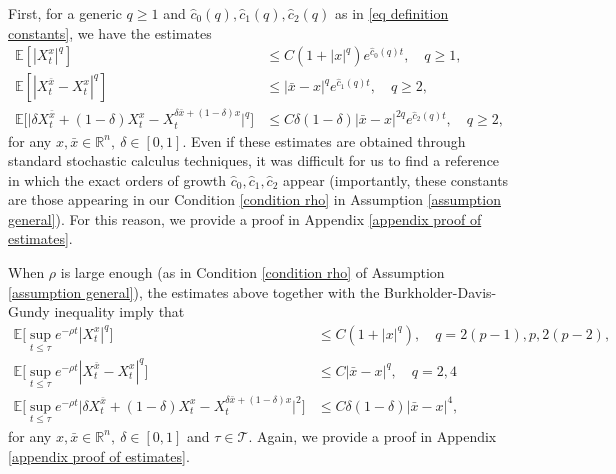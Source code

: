 \documentclass[11pt]{amsart}
\theoremstyle{plain}
\numberwithin{equation}{section}
\begin{document}
First, for a generic $q \geq 1$ and $ \hat c _0(q),  \hat c _1(q),  \hat c _2(q)$ as in \eqref{eq definition constants}, we have the estimates
\begin{align}
\label{eq estimate SDE growth} 
\mathbb{E}[ |  X ^x_t |^{q} ]  & \leq C (1+|x|^q) e^{  \hat c _0(q) t}, \quad q\geq 1,   \\ 
\label{eq estimate SDE Lip} \mathbb{E}[ |  X^{\bar x}_t - X ^x_t |^{q} ] & \leq |\bar{x} - x|^q e^{  \hat c _1(q) t} , \quad q\geq 2, \\ 
 \label{eq estimate SDE semiconv} 
 \mathbb{E} \big[  \big|  \delta X^{\bar x}_t + (1-\delta) X^x_t - X ^{\delta \bar x + (1-\delta) x}_t \big|^q \big] & \leq C \delta (1-\delta) |\bar{x} - x|^{2q} e^{  \hat c _2(q) t}, \quad q \geq 2,
\end{align}
for any $x,\bar x \in \mathbb R ^n, \ \delta \in [0,1]$.
Even if these estimates are obtained through standard stochastic calculus techniques, it was difficult for us to find a reference in which the exact orders of growth $\hat c_0, \hat c_1, \hat c_2$ appear (importantly, these constants are those appearing in our Condition \ref{condition rho} in Assumption \ref{assumption general}). 
For this reason, we provide a proof in Appendix \ref{appendix proof of estimates}.

When $\rho$ is large enough (as in Condition \ref{condition rho} of Assumption \ref{assumption general}), 
the estimates above together with the Burkholder-Davis-Gundy inequality imply that
\begin{align}
\label{eq estimate SDE growth SUP} 
\mathbb{E}\bigg[ \sup_{t \leq \tau}  e^{-\rho t} |  X ^x_t |^{q} \bigg]  & \leq C (1+|x|^q), \quad q = 2(p-1),p,2(p-2),  \\ 
\label{eq estimate SDE Lip SUP} 
\mathbb{E} \bigg[ \sup_{t \leq \tau}  e^{-\rho t} |  X^{\bar x}_t - X ^x_t |^{q} \bigg] & \leq C |\bar{x} - x|^q , \quad q= 2, 4  \\ 
 \label{eq estimate SDE semiconv SUP} 
 \mathbb{E} \bigg[ \sup_{t \leq \tau}  e^{-\rho t} \big|  \delta X^{\bar x}_t + (1-\delta) X^x_t - X ^{\delta \bar x + (1-\delta) x}_t \big|^2 \bigg] & \leq C \delta (1-\delta) |\bar{x} - x|^4,
\end{align}
for any $x,\bar x \in \mathbb R ^n, \ \delta \in [0,1]$ and $\tau \in \mathcal T$. 
Again, we provide a proof in Appendix \ref{appendix proof of estimates}.
\end{document}
